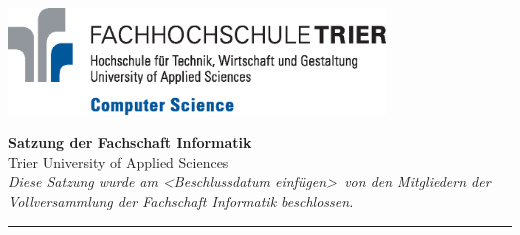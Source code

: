 \documentclass[a4paper, 11pt]{article} %
\begin{document}

\doublespacing
\thispagestyle{empty}

\begin{center}
\includegraphics[width=10.0cm]{../logo_faculty_computer_science.eps}

\vspace*{\fill}
{\LARGE \textbf{Satzung der Fachschaft Informatik}}\\
Trier University of Applied Sciences\\
\vspace{2.5cm}
\textit{
	Diese Satzung wurde am \textless Beschlussdatum einfügen\textgreater\ von den Mitgliedern der Vollversammlung der Fachschaft Informatik beschlossen.
}
\vfill
\end{center}

\hspace*{-35cm}
\textcolor{fsi}{\rule{64.9cm}{15pt}}
\pagebreak
 
\setcounter{tocdepth}{2}
\tableofcontents 
\pagebreak

\singlespacing






\end{document}
